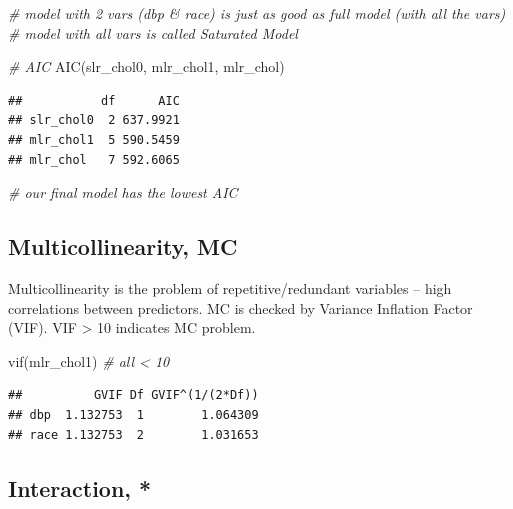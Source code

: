\documentclass[
]{book}
\makeatletter
\newenvironment{Shaded}{\begin{snugshade}}{\end{snugshade}}
\newcommand{\CommentTok}[1]{\textcolor[rgb]{0.37,0.37,0.37}{\textit{#1}}}
\newcommand{\FunctionTok}[1]{\textcolor[rgb]{0,0,0}{#1}}
\newcommand{\NormalTok}[1]{#1}
\newenvironment{kframe}{%
\medskip{}
\setlength{\fboxsep}{.8em}
 \def\at@end@of@kframe{}%
 \ifinner\ifhmode%
  \def\at@end@of@kframe{\end{minipage}}%
  \begin{minipage}{\columnwidth}%
 \fi\fi%
 \def\FrameCommand##1{\hskip\@totalleftmargin \hskip-\fboxsep
 \colorbox{shadecolor}{##1}\hskip-\fboxsep
     \hskip-\linewidth \hskip-\@totalleftmargin \hskip\columnwidth}%
 \MakeFramed {\advance\hsize-\width
   \@totalleftmargin\z@ \linewidth\hsize
   \@setminipage}}%
 {\par\unskip\endMakeFramed%
 \at@end@of@kframe}
\renewenvironment{Shaded}{\begin{kframe}}{\end{kframe}}
\makeatother
\begin{document}
\begin{Shaded}
\begin{Highlighting}[]
\CommentTok{\# model with 2 vars (dbp \& race) is just as good as full model (with all the vars)}
\CommentTok{\# model with all vars is called Saturated Model}
\end{Highlighting}
\end{Shaded}

\begin{Shaded}
\begin{Highlighting}[]
\CommentTok{\# AIC}
\FunctionTok{AIC}\NormalTok{(slr\_chol0, mlr\_chol1, mlr\_chol)}
\end{Highlighting}
\end{Shaded}

\begin{verbatim}
##           df      AIC
## slr_chol0  2 637.9921
## mlr_chol1  5 590.5459
## mlr_chol   7 592.6065
\end{verbatim}

\begin{Shaded}
\begin{Highlighting}[]
\CommentTok{\# our final model has the lowest AIC}
\end{Highlighting}
\end{Shaded}

\hypertarget{multicollinearity-mc}{%
\subsection{Multicollinearity, MC}\label{multicollinearity-mc}}

Multicollinearity is the problem of repetitive/redundant variables -- high correlations between predictors. MC is checked by Variance Inflation Factor (VIF). VIF \textgreater{} 10 indicates MC problem.

\begin{Shaded}
\begin{Highlighting}[]
\FunctionTok{vif}\NormalTok{(mlr\_chol1)  }\CommentTok{\# all \textless{} 10}
\end{Highlighting}
\end{Shaded}

\begin{verbatim}
##          GVIF Df GVIF^(1/(2*Df))
## dbp  1.132753  1        1.064309
## race 1.132753  2        1.031653
\end{verbatim}

\hypertarget{interaction}{%
\subsection{Interaction, *}\label{interaction}}
\end{document}
